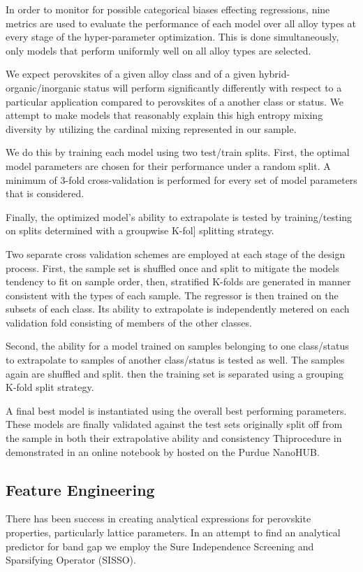 In order to monitor for possible categorical biases effecting regressions, nine metrics are used to evaluate the performance of each model over all alloy types at every stage of the hyper-parameter optimization.
This is done simultaneously, only models that perform uniformly well on all alloy types are selected.

We expect perovskites of a given alloy class and of a given hybrid-organic/inorganic status will perform significantly differently with respect to a particular application compared to perovskites of a another class or status.
We attempt to make models that reasonably explain this high entropy mixing diversity by utilizing the cardinal mixing represented in our sample.

We do this by training each model using two test/train splits.
First, the optimal model parameters are chosen for their performance under a random split.
A minimum of 3-fold cross-validation is performed for every set of model parameters that is considered.

Finally, the optimized model's ability to extrapolate is
tested by training/testing on splits determined with a groupwise
K-fol] splitting strategy.

Two separate cross validation schemes are employed at each stage of the design process.
First, the sample set is shuffled once and split to mitigate the models tendency to fit on sample order, then, stratified K-folds are generated in manner consistent with the types of each sample.
The regressor is then trained on the subsets of each class.
Its ability to extrapolate is independently metered on each validation fold consisting of members of the other classes.

Second, the ability for a model trained on samples belonging to one class/status to extrapolate to samples of another class/status is tested as well.
The samples again are shuffled and split.
then the training set is separated using a grouping K-fold split strategy.

A final best model is instantiated using the overall best performing parameters.
These models are finally validated against the test sets originally split off from the sample in both their extrapolative ability and consistency 
Thiprocedure in demonstrated in an online notebook by \textcite{manganaris-2022-mrs-comput} hosted on the Purdue NanoHUB.

\subsection{Feature Engineering}
\label{sec:org8a817b8}
There has been success in creating analytical expressions for perovskite properties, particularly lattice parameters.
\autocite{jiang-2006-predic-lattic} In an attempt to find an analytical predictor for band gap we employ the Sure Independence Screening and Sparsifying Operator (SISSO).
\autocite{ouyang-2018-sisso} 

